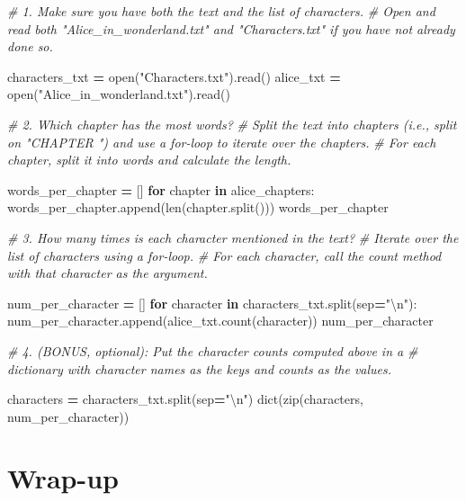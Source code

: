 \documentclass[]{book}
\newenvironment{Shaded}{\begin{snugshade}}{\end{snugshade}}
\newcommand{\KeywordTok}[1]{\textcolor[rgb]{0.13,0.29,0.53}{\textbf{#1}}}
\newcommand{\CharTok}[1]{\textcolor[rgb]{0.31,0.60,0.02}{#1}}
\newcommand{\StringTok}[1]{\textcolor[rgb]{0.31,0.60,0.02}{#1}}
\newcommand{\CommentTok}[1]{\textcolor[rgb]{0.56,0.35,0.01}{\textit{#1}}}
\newcommand{\ControlFlowTok}[1]{\textcolor[rgb]{0.13,0.29,0.53}{\textbf{#1}}}
\newcommand{\OperatorTok}[1]{\textcolor[rgb]{0.81,0.36,0.00}{\textbf{#1}}}
\newcommand{\BuiltInTok}[1]{#1}
\newcommand{\NormalTok}[1]{#1}
\begin{document}
\begin{Shaded}
\begin{Highlighting}[]
\CommentTok{# 1. Make sure you have both the text and the list of characters.}
\CommentTok{# Open and read both "Alice_in_wonderland.txt" and "Characters.txt" if you have not already done so.}

\NormalTok{characters_txt }\OperatorTok{=} \BuiltInTok{open}\NormalTok{(}\StringTok{"Characters.txt"}\NormalTok{).read()}
\NormalTok{alice_txt }\OperatorTok{=} \BuiltInTok{open}\NormalTok{(}\StringTok{"Alice_in_wonderland.txt"}\NormalTok{).read()}

\CommentTok{# 2. Which chapter has the most words?}
\CommentTok{# Split the text into chapters (i.e., split on "CHAPTER ") and use a for-loop to iterate over the chapters.}
\CommentTok{# For each chapter, split it into words and calculate the length.}

\NormalTok{words_per_chapter }\OperatorTok{=}\NormalTok{ []}
\ControlFlowTok{for}\NormalTok{ chapter }\KeywordTok{in}\NormalTok{ alice_chapters:}
\NormalTok{    words_per_chapter.append(}\BuiltInTok{len}\NormalTok{(chapter.split()))}
\NormalTok{words_per_chapter}

\CommentTok{# 3. How many times is each character mentioned in the text?}
\CommentTok{# Iterate over the list of characters using a for-loop. }
\CommentTok{# For each character, call the count method with that character as the argument.}

\NormalTok{num_per_character }\OperatorTok{=}\NormalTok{ []}
\ControlFlowTok{for}\NormalTok{ character }\KeywordTok{in}\NormalTok{ characters_txt.split(sep}\OperatorTok{=}\StringTok{"}\CharTok{\textbackslash{}n}\StringTok{"}\NormalTok{):}
\NormalTok{    num_per_character.append(alice_txt.count(character))}
\NormalTok{num_per_character}

\CommentTok{# 4. (BONUS, optional): Put the character counts computed above in a }
\CommentTok{# dictionary with character names as the keys and counts as the values.}

\NormalTok{characters }\OperatorTok{=}\NormalTok{ characters_txt.split(sep}\OperatorTok{=}\StringTok{"}\CharTok{\textbackslash{}n}\StringTok{"}\NormalTok{)}
\BuiltInTok{dict}\NormalTok{(}\BuiltInTok{zip}\NormalTok{(characters, num_per_character))}
\end{Highlighting}
\end{Shaded}

\section{Wrap-up}\label{wrap-up-5}
\end{document}
